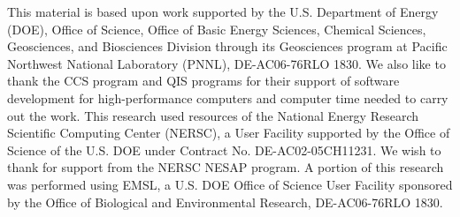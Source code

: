 \begin{acknowledgement}
This material is based upon work supported by the U.S. Department of Energy (DOE), Office of Science, Office of Basic Energy Sciences, Chemical Sciences, Geosciences, and Biosciences Division through its Geosciences program at Pacific Northwest National Laboratory (PNNL), DE-AC06-76RLO 1830. We also like to thank the CCS program and QIS programs for their support of software development for high-performance computers and computer time needed to carry out the work.  This research used resources of the National Energy Research Scientific Computing Center (NERSC), a User Facility supported by the Office of Science of the U.S. DOE under Contract No. DE-AC02-05CH11231. We wish to thank for support from the NERSC NESAP program.  A portion of this research was performed using EMSL, a U.S. DOE Office of Science User Facility sponsored by the Office of Biological and Environmental Research, DE-AC06-76RLO 1830.
\end{acknowledgement}